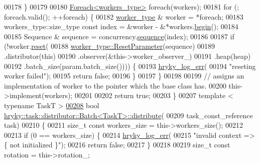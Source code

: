 \begin{DoxyCode}
00178     \}
00179 
00180     \hyperlink{classhryky_1_1_foreach}{Foreach<workers_type>} \textcolor{keywordflow}{foreach}(workers);
00181     \textcolor{keywordflow}{for} (; \textcolor{keywordflow}{foreach}.valid(); ++\textcolor{keywordflow}{foreach}) \{
00182         \hyperlink{classhryky_1_1task_1_1worker_1_1_base}{worker_type} & worker = *\textcolor{keywordflow}{foreach};
00183         workers\_type::size\_type \textcolor{keyword}{const} index = &worker - &*workers.\hyperlink{classhryky_1_1_vector_aa032aa9e48dce836e68434e6ad58f0f5}{begin}();
00184         
00185         Sequence & sequence = concurrency.\hyperlink{classhryky_1_1task_1_1_concurrency_aa82281dbb7df8aa9fcad2acb9ecb4531}{sequence}(index);
00186 
00187         \textcolor{keywordflow}{if} (!worker.\hyperlink{classhryky_1_1task_1_1worker_1_1_base_a2dfa3093b3165d58ed31aa575ae1b159}{reset}(
00188             \hyperlink{structhryky_1_1task_1_1worker_1_1_base_1_1_reset_parameter}{worker_type::ResetParameter}(sequence)
00189             .distributor(\textcolor{keyword}{this})
00190             .observer(&this->worker\_observer\_)
00191             .heap(heap)
00192             .batch\_size(param.batch\_size()))) \{
00193             \hyperlink{log__writer__common_8h_ae5ad3dabb33f594695ef40753cb78aad}{hryky_log_err}(
00194                 \textcolor{stringliteral}{"reseting worker failed"});
00195             \textcolor{keywordflow}{return} \textcolor{keyword}{false};
00196         \}
00197     \}
00198 
00199     \textcolor{comment}{// assigns an implementation of worker to the pointer which the base class
       has.}
00200     this->implement(workers);
00201 
00202     \textcolor{keywordflow}{return} \textcolor{keyword}{true};
00203 \}
00207 \textcolor{keyword}{template} < \textcolor{keyword}{typename} TaskT >
\hypertarget{task__distributor__batch_8h_source_l00208}{}\hyperlink{group__task_gaaa80eb88fb7d7223214dd039ae52ed16}{00208} \textcolor{keywordtype}{bool} \hyperlink{classhryky_1_1task_1_1distributor_1_1_batch}{hryky::task::distributor::Batch<TaskT>::distribute}(
00209     task\_const\_reference task)
00210 \{
00211     \textcolor{keywordtype}{size\_t} \textcolor{keyword}{const} workers\_size = this->workers\_size();
00212 
00213     \textcolor{keywordflow}{if} (0 == workers\_size) \{
00214         \hyperlink{log__writer__common_8h_ae5ad3dabb33f594695ef40753cb78aad}{hryky_log_err}(
00215             \textcolor{stringliteral}{"invalid context => \{ not initialized \}"});
00216         \textcolor{keywordflow}{return} \textcolor{keyword}{false};
00217     \}
00218 
00219     \textcolor{keywordtype}{size\_t} \textcolor{keyword}{const} rotation = this->rotation\_;

\end{DoxyCode}

